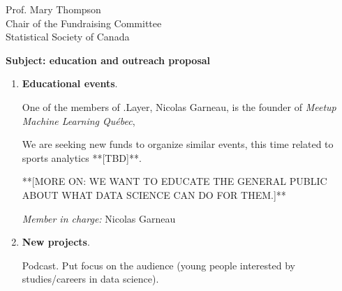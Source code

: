 \documentclass[11pt, a4paper]{letter} %
\begin{document}
\begin{letter}{
	Prof. Mary Thompson\\
	Chair of the Fundraising Committee\\
	Statistical Society of Canada
	
	\bigskip
	\textbf{Subject: education and outreach proposal}%
}
\begin{enumerate}
	\quad We are lucky to have among us a professional graphic designer, Jean-Christophe Yelle, who created, at no cost, the logo that you can see in the head of the letter. We are now working on a bilingual display of the website (en/fr). So far, some of the articles are in English, some in French. In order to be as inclusive as possible, we would like to have the important posts in both languages. Of course, we can do it ourselves, which we will do; but a little help from a professional, at least for reviewing our translations, would be of great use. Among the other things we wish to integrate to the community are personalized e-mail addresses (@dotlayer.org) for the administering members and +++++++ [help spreading the word! *social media expert*]. These services, although not particularly expensive, are not free. To pay them, we intend to ask a small contribution from our members, as well as getting funds from sponsors. Paying such fee however, will never be required for contributing to the blog or participating to any of the community's activities. We seek your support here to keep the membership fee as low as possible.
	
	\bigskip
	\emph{Member in charge:} Stéphane Caron\\
	
	\item \textbf{Educational events}.
	
	\quad One of the members of .Layer, Nicolas Garneau, is the founder of \emph{Meetup	Machine Learning Québec}, 
	
\quad We are seeking new funds to organize similar events, this time related to sports analytics **[TBD]**.
	
**[MORE ON: WE WANT TO EDUCATE THE GENERAL PUBLIC ABOUT WHAT DATA SCIENCE CAN DO FOR THEM.]**
			
	\bigskip
	\emph{Member in charge:} Nicolas Garneau\\
	
	\item \textbf{New projects}.
	
	\quad Podcast. Put focus on the audience (young people interested by studies/careers in data science).
	

\end{enumerate}
\end{letter}
\end{document}
